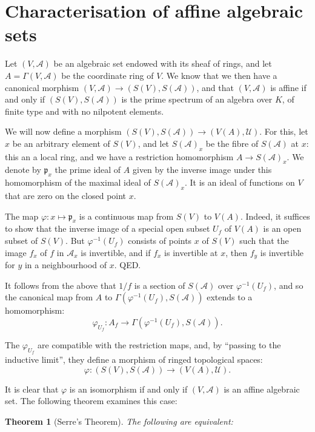 \documentclass{article}
\theoremstyle{plain}
\newtheorem*{theorem}{Theorem}
\theoremstyle{definition}
\newcommand{\sh}{\mathscr}
\newcommand{\oldpage}[1]{\marginpar{\footnotesize$\Big\vert$ \textit{p.~#1}}}
\begin{document}
\section{Characterisation of affine algebraic sets}
\label{section4}

Let $(V,\sh{A})$ be an algebraic set endowed with its sheaf of rings, and let $A=\Gamma(V,\sh{A})$ be the coordinate ring of $V$.
We know that we then have a canonical morphism $(V,\sh{A})\to(S(V),S(\sh{A}))$, and that $(V,\sh{A})$ is affine if and only if $(S(V),S(\sh{A}))$ is the prime spectrum of an algebra over $K$, of finite type and with no nilpotent elements.

We will now define a morphism $(S(V),S(\sh{A}))\to(V(A),\sh{U})$.
For this, let $x$ be an arbitrary element of $S(V)$, and let $S(\sh{A})_x$ be the fibre of $S(\sh{A})$ at $x$: this an a local ring, and we have a restriction homomorphism $A\to S(\sh{A})_x$.
We denote by $\mathfrak{p}_x$ the prime ideal of $A$ given by the inverse image under this homomorphism of the maximal ideal of $S(\sh{A})_x$.
It is an ideal of functions on $V$ that are zero on the closed point $x$.

The map $\varphi\colon x\mapsto\mathfrak{p}_x$ is a continuous map from $S(V)$ to $V(A)$.
Indeed, it suffices to show that the inverse image of a special open subset $U_f$ of $V(A)$ is an open subset of $S(V)$.
But $\varphi^{-1}(U_f)$ consists of points $x$ of $S(V)$ such that the image $f_x$ of $f$ in $\sh{A}_x$ is invertible, and if $f_x$ is invertible at $x$, then $f_y$ is invertible for $y$ in a neighbourhood of $x$.
QED.

It follows from the above that $1/f$ is a section of $S(\sh{A})$ over $\varphi^{-1}(U_f)$, and so the canonical map from $A$ to $\Gamma(\varphi^{-1}(U_f),S(\sh{A}))$ extends to a homomorphism:
\[
  \varphi_{U_f}\colon A_f \to \Gamma(\varphi^{-1}(U_f), S(\sh{A})).
\]

The $\varphi_{U_f}$ are compatible with the restriction maps, and, by ``passing to the inductive limit'', they define a morphism of ringed topological spaces:
\oldpage{2-05}
\[
  \varphi\colon (S(V),S(\sh{A})) \to (V(A),\sh{U}).
\]

It is clear that $\varphi$ is an isomorphism if and only if $(V,\sh{A})$ is an affine algebraic set.
The following theorem examines this case:

\begin{theorem}[Serre's Theorem]
  The following are equivalent:
\end{theorem}
\end{document}
